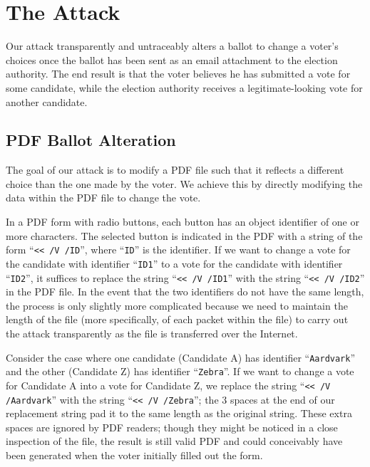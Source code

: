 \documentclass{article}
\begin{document}
\section{The Attack}

Our attack transparently and untraceably alters a ballot to change a
voter's choices once the ballot has been sent as an email attachment
to the election authority. The end result is that the voter believes
he has submitted a vote for some candidate, while the election
authority receives a legitimate-looking vote for another candidate.

\subsection{PDF Ballot Alteration}

The goal of our attack is to modify a PDF file such that it reflects a
different choice than the one made by the voter. We achieve this by
directly modifying the data within the PDF file to change the
vote. 

In a PDF form with radio buttons, each button has an object identifier
of one or more characters. The selected button is indicated in the PDF
with a string of the form ``\texttt{<{}< /V /ID}'', where
``\texttt{ID}'' is the identifier. If we want to change a vote for the
candidate with identifier ``\texttt{ID1}'' to a vote for the candidate
with identifier ``\texttt{ID2}'', it suffices to replace the string
``\texttt{<{}< /V /ID1}'' with the string ``\texttt{<{}< /V /ID2}'' in
the PDF file. In the event that the two identifiers do not have the
same length, the process is only slightly more complicated because we
need to maintain the length of the file (more specifically, of each
packet within the file) to carry out the attack transparently as the
file is transferred over the Internet.

Consider the case where one candidate (Candidate A) has identifier
``\texttt{Aardvark}'' and the other (Candidate Z) has identifier
``\texttt{Zebra}''. If we want to change a vote for Candidate A into a
vote for Candidate Z, we replace the string ``\texttt{<{}< /V
  /Aardvark}'' with the string ``\texttt{<{}< /V
  /Zebra\textvisiblespace\textvisiblespace\textvisiblespace}''; the 3
spaces at the end of our replacement string pad it to the same length
as the original string. These extra spaces are ignored by PDF readers;
though they might be noticed in a close inspection of the file, the
result is still valid PDF and could conceivably have been generated
when the voter initially filled out the form.
\end{document}
